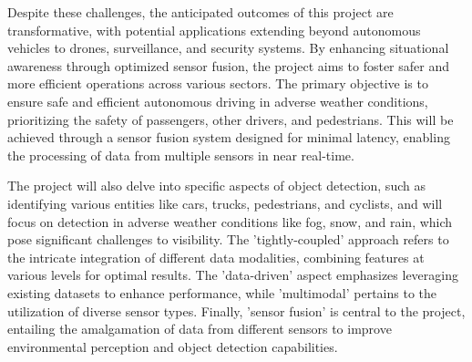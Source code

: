 \documentclass[report.tex]{subfiles}
\begin{document}
        Despite these challenges, the anticipated outcomes of this project are transformative, with potential applications extending beyond autonomous vehicles to drones, surveillance, and security systems. By enhancing situational awareness through optimized sensor fusion, the project aims to foster safer and more efficient operations across various sectors. The primary objective is to ensure safe and efficient autonomous driving in adverse weather conditions, prioritizing the safety of passengers, other drivers, and pedestrians. This will be achieved through a sensor fusion system designed for minimal latency, enabling the processing of data from multiple sensors in near real-time.

        The project will also delve into specific aspects of object detection, such as identifying various entities like cars, trucks, pedestrians, and cyclists, and will focus on detection in adverse weather conditions like fog, snow, and rain, which pose significant challenges to visibility. The 'tightly-coupled' approach refers to the intricate integration of different data modalities, combining features at various levels for optimal results. The 'data-driven' aspect emphasizes leveraging existing datasets to enhance performance, while 'multimodal' pertains to the utilization of diverse sensor types. Finally, 'sensor fusion' is central to the project, entailing the amalgamation of data from different sensors to improve environmental perception and object detection capabilities.
    




\end{document}
